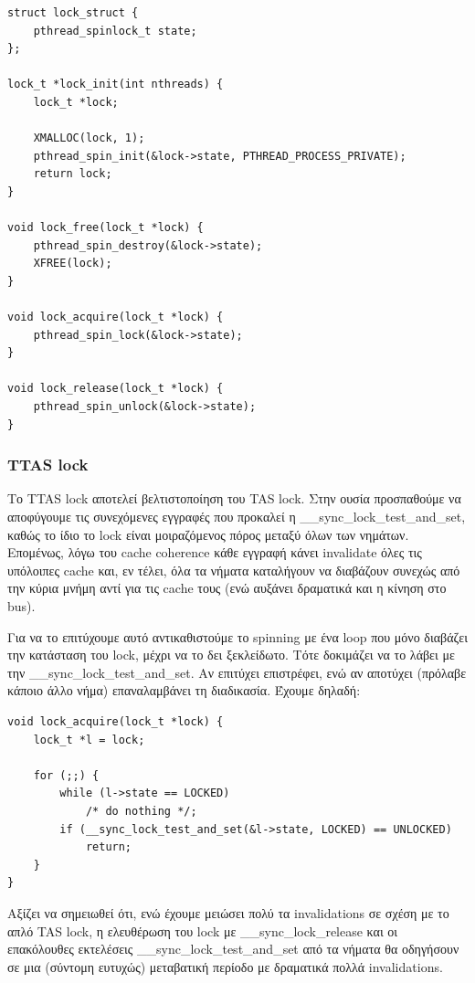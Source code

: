 \documentclass[12pt,titlepage]{article}
\begin{document}
\begin{verbatim}
struct lock_struct {
    pthread_spinlock_t state;
};

lock_t *lock_init(int nthreads) {
    lock_t *lock;

    XMALLOC(lock, 1);
    pthread_spin_init(&lock->state, PTHREAD_PROCESS_PRIVATE);
    return lock;
}

void lock_free(lock_t *lock) {
    pthread_spin_destroy(&lock->state);
    XFREE(lock);
}

void lock_acquire(lock_t *lock) {
    pthread_spin_lock(&lock->state);
}

void lock_release(lock_t *lock) {
    pthread_spin_unlock(&lock->state);
}
\end{verbatim}

\subsubsection{TTAS lock}

Το TTAS lock αποτελεί βελτιστοποίηση του TAS lock. Στην ουσία προσπαθούμε να
αποφύγουμε τις συνεχόμενες εγγραφές που προκαλεί η
\_\_sync\_lock\_test\_and\_set, καθώς το ίδιο το lock είναι μοιραζόμενος πόρος
μεταξύ όλων των νημάτων. Επομένως, λόγω του cache coherence κάθε εγγραφή κάνει
invalidate όλες τις υπόλοιπες cache και, εν τέλει, όλα τα νήματα καταλήγουν να
διαβάζουν συνεχώς από την κύρια μνήμη αντί για τις cache τους (ενώ αυξάνει
δραματικά και η κίνηση στο bus).

Για να το επιτύχουμε αυτό αντικαθιστούμε το spinning με ένα loop που μόνο
διαβάζει την κατάσταση του lock, μέχρι να το δει ξεκλείδωτο. Τότε δοκιμάζει να
το λάβει με την \_\_sync\_lock\_test\_and\_set. Αν επιτύχει επιστρέφει, ενώ αν
αποτύχει (πρόλαβε κάποιο άλλο νήμα) επαναλαμβάνει τη διαδικασία. Έχουμε δηλαδή:

\begin{verbatim}
void lock_acquire(lock_t *lock) {
    lock_t *l = lock;

    for (;;) {
        while (l->state == LOCKED)
            /* do nothing */;
        if (__sync_lock_test_and_set(&l->state, LOCKED) == UNLOCKED)
            return;
    }
}
\end{verbatim}

Αξίζει να σημειωθεί ότι, ενώ έχουμε μειώσει πολύ τα invalidations σε σχέση με
το απλό TAS lock, η ελευθέρωση του lock με \_\_sync\_lock\_release και οι
επακόλουθες εκτελέσεις \_\_sync\_lock\_test\_and\_set από τα νήματα θα οδηγήσουν
σε μια (σύντομη ευτυχώς) μεταβατική περίοδο με δραματικά πολλά invalidations.
\end{document}

